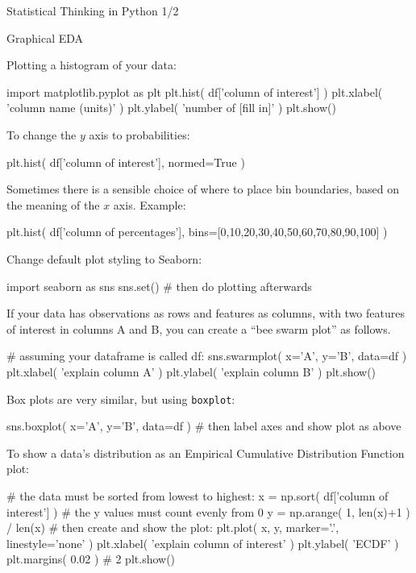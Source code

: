 \documentclass[a4paper,landscape,columns=3]{cheatsheet}
\def\chap#1{\vspace{5mm}\begin{tcolorbox}[colback=red!5!white,colframe=red!75!black,leftrule=3mm]
    \Large #1
\end{tcolorbox}}
\def\sect#1{\begin{tcolorbox}[colback=blue!5!white,colframe=blue!75!black,size=title,leftrule=2mm]
    \large #1
\end{tcolorbox}}
\begin{document}
\chap{Statistical Thinking in Python 1/2}

\sect{Graphical EDA}

Plotting a histogram of your data:
\begin{python}
import matplotlib.pyplot as plt
plt.hist( df['column of interest'] )
plt.xlabel( 'column name (units)' )
plt.ylabel( 'number of [fill in]' )
plt.show()
\end{python}

To change the $y$ axis to probabilities:
\begin{python}
plt.hist( df['column of interest'], normed=True )
\end{python}

Sometimes there is a sensible choice of where to place bin boundaries, based on the meaning of the $x$ axis.  Example:
\begin{python}
plt.hist( df['column of percentages'],
          bins=[0,10,20,30,40,50,60,70,80,90,100] )
\end{python}

Change default plot styling to Seaborn:
\begin{python}
import seaborn as sns
sns.set()
# then do plotting afterwards
\end{python}

If your data has observations as rows and features as columns, with two features of interest in columns A and B, you can create a ``bee swarm plot'' as follows.
\begin{python}
# assuming your dataframe is called df:
sns.swarmplot( x='A', y='B', data=df )
plt.xlabel( 'explain column A' )
plt.ylabel( 'explain column B' )
plt.show()
\end{python}

Box plots are very similar, but using \lstinline{boxplot}:
\begin{python}
sns.boxplot( x='A', y='B', data=df )
# then label axes and show plot as above
\end{python}

To show a data's distribution as an Empirical Cumulative Distribution Function plot:
\begin{python}
# the data must be sorted from lowest to highest:
x = np.sort( df['column of interest'] )
# the y values must count evenly from 0%
y = np.arange( 1, len(x)+1 ) / len(x)
# then create and show the plot:
plt.plot( x, y, marker='.', linestyle='none' )
plt.xlabel( 'explain column of interest' )
plt.ylabel( 'ECDF' )
plt.margins( 0.02 )  # 2%
plt.show()
\end{python}
\end{document}
